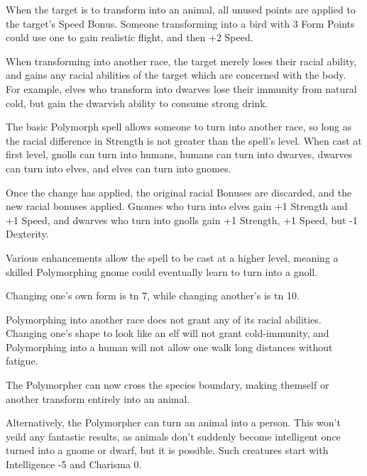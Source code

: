 \begin{multicols}{2}
\begin{itemize}
\end{itemize}

When the target is to transform into an animal, all unused points are applied to the target's Speed Bonus.  Someone transforming into a bird with 3 Form Points could use one to gain realistic flight, and then +2 Speed.

When transforming into another race, the target merely loses their racial ability, and gains any racial abilities of the target which are concerned with the body.  For example, elves who transform into dwarves lose their immunity from natural cold, but gain the dwarvish ability to consume strong drink.

\spelllevel


\noindent
The basic Polymorph spell allows someone to turn into another race, so long as the racial difference in Strength is not greater than the spell's level.
When cast at first level, gnolls can turn into humans, humans can turn into dwarves, dwarves can turn into elves, and elves can turn into gnomes.

Once the change has applied, the original racial Bonuses are discarded, and the new racial bonuses applied.
Gnomes who turn into elves gain +1 Strength and +1 Speed, and dwarves who turn into gnolls gain +1 Strength, +1 Speed, but -1 Dexterity.

Various enhancements allow the spell to be cast at a higher level, meaning a skilled Polymorphing gnome could eventually learn to turn into a gnoll.

Changing one's own form is \gls{tn} 7, while changing another's is \gls{tn} 10.

Polymorphing into another race does not grant any of its racial abilities.
Changing one's shape to look like an elf will not grant cold-immunity, and Polymorphing into a human will not allow one walk long distances without fatigue.


The Polymorpher can now cross the species boundary, making themself or another transform entirely into an animal.

Alternatively, the Polymorpher can turn an animal into a person.
This won't yeild any fantastic results, as animals don't suddenly become intelligent once turned into a gnome or dwarf, but it is possible.
Such creatures start with Intelligence -5 and Charisma 0.


\end{multicols}
